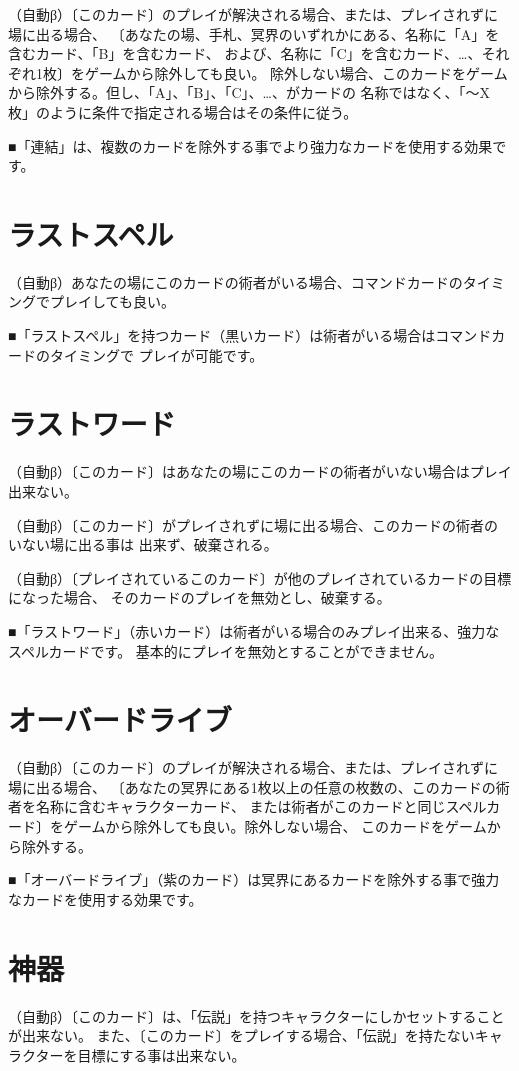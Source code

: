 \documentclass[
	fontsize=9pt,
	twocolumn,
	hanging_punctuation,
	paper=a4paper,
	gutter=15mm,
	fore-edge=15mm,
	head_space=15mm,
	foot_space=15mm,
]{jlreq}
\newcommand{\↴}{{\jfontspec{nishiki-teki}↴}}
\begin{document}
（自動β）〔このカード〕のプレイが解決される場合、または、プレイされずに場に出る場合、
〔あなたの場、手札、冥界のいずれかにある、名称に「A」を含むカード、「B」を含むカード、
および、名称に「C」を含むカード、…、それぞれ1枚〕をゲームから除外しても良い。
除外しない場合、このカードをゲームから除外する。但し、「A」、「B」、「C」、…、がカードの
名称ではなく、「～X 枚」のように条件で指定される場合はその条件に従う。

■「連結」は、複数のカードを除外する事でより強力なカードを使用する効果です。

\section*{ラストスペル}
（自動β）あなたの場にこのカードの術者がいる場合、コマンドカードのタイミングでプレイしても良い。

■「ラストスペル」を持つカード（黒いカード）は術者がいる場合はコマンドカードのタイミングで
プレイが可能です。

\section*{ラストワード}
（自動β）〔このカード〕はあなたの場にこのカードの術者がいない場合はプレイ出来ない。

（自動β）〔このカード〕がプレイされずに場に出る場合、このカードの術者のいない場に出る事は
出来ず、破棄される。

（自動β）〔プレイされているこのカード〕が他のプレイされているカードの目標になった場合、
そのカードのプレイを無効とし、破棄する。

■「ラストワード」（赤いカード）は術者がいる場合のみプレイ出来る、強力なスペルカードです。
基本的にプレイを無効とすることができません。

\section*{オーバードライブ}
（自動β）〔このカード〕のプレイが解決される場合、または、プレイされずに場に出る場合、
〔あなたの冥界にある1枚以上の任意の枚数の、このカードの術者を名称に含むキャラクターカード、
または術者がこのカードと同じスペルカード〕をゲームから除外しても良い。除外しない場合、
このカードをゲームから除外する。

■「オーバードライブ」（紫のカード）は冥界にあるカードを除外する事で強力なカードを使用する効果です。

\pagebreak
\section*{神器}
（自動β）〔このカード〕は、「伝説」を持つキャラクターにしかセットすることが出来ない。
また、〔このカード〕をプレイする場合、「伝説」を持たないキャラクターを目標にする事は出来ない。
\end{document}
